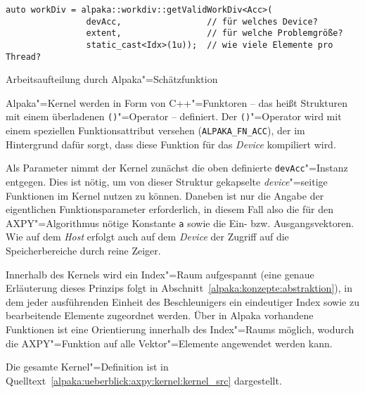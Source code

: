 \begin{code}
    \begin{verbatim}
auto workDiv = alpaka::workdiv::getValidWorkDiv<Acc>(
                devAcc,                 // für welches Device?
                extent,                 // für welche Problemgröße?
                static_cast<Idx>(1u));  // wie viele Elemente pro Thread?
    \end{verbatim}
    \caption{Arbeitsaufteilung durch Alpaka"=Schätzfunktion}
    \label{alpaka:ueberblick:axpy:kernel:workdiv}
\end{code}

Alpaka"=Kernel werden in Form von C++"=Funktoren -- das heißt Strukturen mit
einem überladenen \texttt{()}"=Operator -- definiert. Der \texttt{()}"=Operator
wird mit einem speziellen Funktionsattribut versehen (\texttt{ALPAKA\_FN\_ACC}),
der im Hintergrund dafür sorgt, dass diese Funktion für das \textit{Device}
kompiliert wird.

Als Parameter nimmt der Kernel zunächst die oben definierte
\texttt{devAcc}"=Instanz entgegen. Dies ist nötig, um von dieser Struktur
gekapselte \textit{device}"=seitige Funktionen im Kernel nutzen zu können.
Daneben ist nur die Angabe der eigentlichen Funktionsparameter erforderlich,
in diesem Fall also die für den AXPY"=Algorithmus nötige Konstante \texttt{a}
sowie die Ein- bzw. Ausgangsvektoren. Wie auf dem \textit{Host} erfolgt auch auf
dem \textit{Device} der Zugriff auf die Speicherbereiche durch reine Zeiger.

Innerhalb des Kernels wird ein Index"=Raum aufgespannt (eine genaue Erläuterung
dieses Prinzips folgt in Abschnitt~\ref{alpaka:konzepte:abstraktion}), in dem
jeder ausführenden Einheit des Beschleunigers ein eindeutiger Index sowie zu
bearbeitende Elemente zugeordnet werden. Über in Alpaka vorhandene Funktionen
ist eine Orientierung innerhalb des Index"=Raums möglich, wodurch die
AXPY"=Funktion auf alle Vektor"=Elemente angewendet werden kann.

Die gesamte Kernel"=Definition ist in
Quelltext~\ref{alpaka:ueberblick:axpy:kernel:kernel_src} dargestellt.

